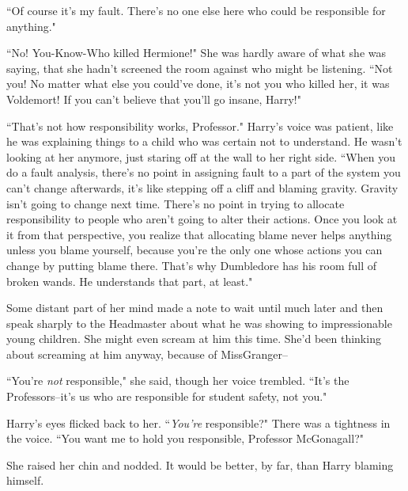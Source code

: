 ``Of course it's my fault. There's no one else here who could be responsible for anything."

``No! You-Know-Who killed Hermione!" She was hardly aware of what she was saying, that she hadn't screened the room against who might be listening. ``Not you! No matter what else you could've done, it's not you who killed her, it was Voldemort! If you can't believe that you'll go insane, Harry!"

``That's not how responsibility works, Professor." Harry's voice was patient, like he was explaining things to a child who was certain not to understand. He wasn't looking at her anymore, just staring off at the wall to her right side. ``When you do a fault analysis, there's no point in assigning fault to a part of the system you can't change afterwards, it's like stepping off a cliff and blaming gravity. Gravity isn't going to change next time. There's no point in trying to allocate responsibility to people who aren't going to alter their actions. Once you look at it from that perspective, you realize that allocating blame never helps anything unless you blame yourself, because you're the only one whose actions you can change by putting blame there. That's why Dumbledore has his room full of broken wands. He understands that part, at least."

Some distant part of her mind made a note to wait until much later and then speak sharply to the Headmaster about what he was showing to impressionable young children. She might even scream at him this time. She'd been thinking about screaming at him anyway, because of Miss\?Granger\---

``You're \emph{not} responsible," she said, though her voice trembled. ``It's the Professors\---it's us who are responsible for student safety, not you."

Harry's eyes flicked back to her. ``\emph{You're} responsible?" There was a tightness in the voice. ``You want me to hold you responsible, Professor McGonagall?"

She raised her chin and nodded. It would be better, by far, than Harry blaming himself.

